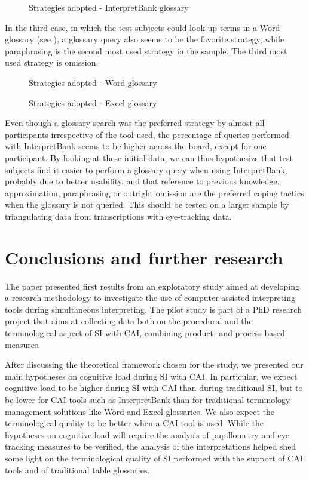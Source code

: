 \documentclass[output=paper]{langsci/langscibook}
\begin{document}
\begin{figure}
\caption{Strategies adopted - InterpretBank glossary}
\label{fig:prandi:16}
\end{figure}

In the third case, in which the test subjects could look up terms in a Word glossary (see ), a glossary query also seems to be the favorite strategy, while paraphrasing is the second most used strategy in the sample. The third most used strategy is omission.

\begin{figure}
\caption{Strategies adopted - Word glossary}
\label{fig:prandi:18}
\end{figure}

\begin{figure}
\caption{Strategies adopted - Excel glossary}
\label{fig:prandi:17}
\end{figure}

Even though a glossary search was the preferred strategy by almost all participants irrespective of the tool used, the percentage of queries performed with InterpretBank seems to be higher across the board, except for one participant. By looking at these initial data, we can thus hypothesize that test subjects find it easier to perform a glossary query when using InterpretBank, probably due to better usability, and that reference to previous knowledge, approximation, paraphrasing or outright omission are the preferred coping tactics when the glossary is not queried. This should be tested on a larger sample by triangulating data from transcriptions with eye-tracking data. 

\section{Conclusions and further research}\label{sec:prandi:6}
The paper presented first results from an exploratory study aimed at developing a research methodology to investigate the use of computer-assisted interpreting tools during simultaneous interpreting. The pilot study is part of a PhD research project that aims at collecting data both on the procedural and the terminological aspect of \textsc{SI} with \textsc{CAI}, combining product- and process-based measures. 

After discussing the theoretical framework chosen for the study, we presented our main hypotheses on cognitive load during \textsc{SI} with \textsc{CAI}. In particular, we expect cognitive load to be higher during \textsc{SI} with \textsc{CAI} than during traditional \textsc{SI}, but to be lower for \textsc{CAI} tools such as InterpretBank than for traditional terminology management solutions like Word and Excel glossaries. We also expect the terminological quality to be better when a \textsc{CAI} tool is used. While the hypotheses on cognitive load will require the analysis of pupillometry and eye-tracking measures to be verified, the analysis of the interpretations helped shed some light on the terminological quality of \textsc{SI} performed with the support of \textsc{CAI} tools and of traditional table glossaries. 
\end{document}

